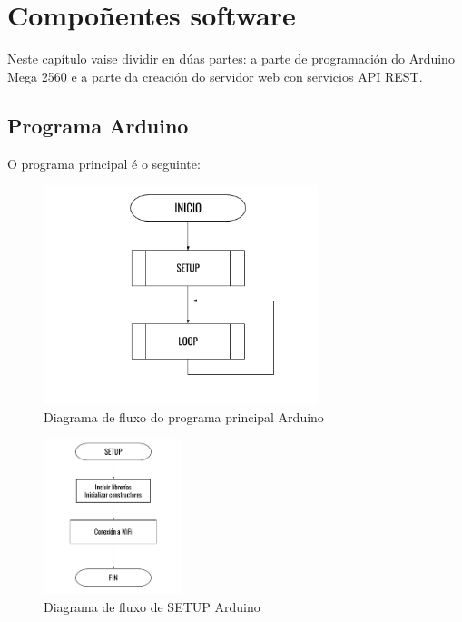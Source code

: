 \documentclass[11pt,twoside]{book}
\begin{document}
\chapter{Compoñentes software}

Neste capítulo vaise dividir en dúas partes: a parte de programación do Arduino Mega 2560 e a parte da creación do servidor web con servicios API REST.

\section{Programa Arduino}

O programa principal é o seguinte:

\begin{figure}[H]
	\begin{center}
		\includegraphics[width=8cm]{images/diagrama_flujo_inicio.png}
	\end{center}
	\caption{Diagrama de fluxo do programa principal Arduino}
	\label{fig:FluxoPrincipal}
\end{figure}

\begin{figure}[H]
	\begin{center}
		\includegraphics[width=4cm]{images/diagrama_flujo_setup.png}
	\end{center}
	\caption{Diagrama de fluxo de SETUP Arduino}
	\label{fig:FluxoSETUP}
\end{figure}
\end{document}
